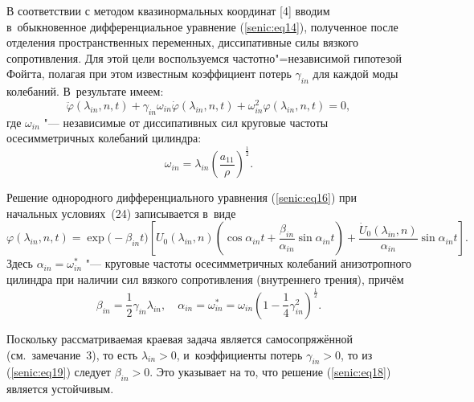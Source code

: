 В соответствии с методом квазинормальных координат [4] вводим в~обыкновенное 
дифференциальное уравнение (\ref{senic:eq14}), полученное после отделения пространственных 
переменных, диссипативные силы вязкого сопротивления. Для этой цели 
воспользуемся частотно"=независимой гипотезой Фойгта, полагая при этом 
известным коэффициент потерь $\gamma _{in} $ для каждой моды колебаний. В~результате имеем:
\begin{equation}
\label{senic:eq16}
\ddot \varphi \left( \lambda _{in}, n, t \right) + \gamma _{in} \omega_{in}\dot \varphi \left( \lambda _{in}, n, t \right) + \omega _{in}^2 \varphi \left( \lambda _{in}, n, t \right) = 0,
\end{equation}
где $\omega _{in}  $ "--- независимые от диссипативных сил круговые частоты 
осесимметричных колебаний цилиндра:
\begin{equation}
\label{senic:eq17}
\omega _{in} = \lambda _{in} \left( {\frac{a_{11} }{\rho }} 
\right)^{\frac{1}{2}}.
\end{equation}


Решение однородного дифференциального уравнения (\ref{senic:eq16}) при начальных условиях~(24) записывается в~виде
\begin{equation}
\label{senic:eq18}
\varphi \left( \lambda _{in}, n, t\right) = \exp\big(- \beta _{in} t\big)
\left[ {U_0\left( \lambda _{in}, n \right)\left( \cos \alpha _{in} t + 
\frac{\beta _{in} }{\alpha _{in} }\sin \alpha _{in} t \right) + 
\frac{\dot U_0 \left( \lambda _{in}, n\right) }{\alpha _{in} }\sin \alpha _{in} t} \right].
\end{equation}
Здесь $\alpha _{in} = \omega _{in}^ *   $ "---  круговые частоты 
осесимметричных колебаний анизотропного цилиндра при наличии сил вязкого 
сопротивления (внутреннего трения), причём 
\begin{equation}
\label{senic:eq19}
\beta _{in} = \frac12\gamma _{in} \lambda _{in},\quad 
\alpha _{in} = \omega _{in}^* = \omega _{in} \left( 1 - \frac14\gamma _{in}^2  \right)^{\frac{1}{2}}.
\end{equation}

Поскольку рассматриваемая краевая задача является самосопряжённой (см.~замечание~3), то есть $\lambda _{in} > 0$, и~коэффициенты потерь $\gamma _{in}> 0$, то из (\ref{senic:eq19}) следует $\beta _{in} > 0$. Это указывает на то, что решение (\ref{senic:eq18}) является устойчивым.

